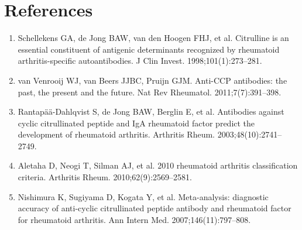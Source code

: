 \section*{References}
\begin{enumerate}
  \item Schellekens GA, de Jong BAW, van den Hoogen FHJ, et al. Citrulline is an essential constituent of antigenic determinants recognized by rheumatoid arthritis-specific autoantibodies. J Clin Invest. 1998;101(1):273--281.
  \item van Venrooij WJ, van Beers JJBC, Pruijn GJM. Anti-CCP antibodies: the past, the present and the future. Nat Rev Rheumatol. 2011;7(7):391--398.
  \item Rantap\"a\"a-Dahlqvist S, de Jong BAW, Berglin E, et al. Antibodies against cyclic citrullinated peptide and IgA rheumatoid factor predict the development of rheumatoid arthritis. Arthritis Rheum. 2003;48(10):2741--2749.
  \item Aletaha D, Neogi T, Silman AJ, et al. 2010 rheumatoid arthritis classification criteria. Arthritis Rheum. 2010;62(9):2569--2581.
  \item Nishimura K, Sugiyama D, Kogata Y, et al. Meta-analysis: diagnostic accuracy of anti-cyclic citrullinated peptide antibody and rheumatoid factor for rheumatoid arthritis. Ann Intern Med. 2007;146(11):797--808.
\end{enumerate}

\clearpage
